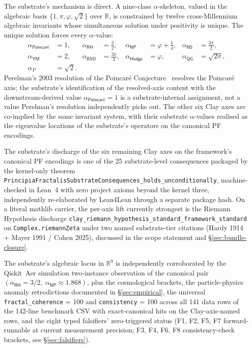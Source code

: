 \documentclass[11pt,a4paper]{amsart}
\theoremstyle{plain}
\theoremstyle{definition}
\begin{document}
The substrate's mechanism is direct. A nine-class $\alpha$-skeleton, valued in the algebraic basis $\{1,\pi,\varphi,\sqrt{2}\}$ over $\mathbb{R}$, is constrained by twelve cross-Millennium algebraic invariants whose simultaneous solution under positivity is unique. The unique solution forces every $\alpha$-value:
\[
\begin{aligned}
\alpha_{\textsf{Poincar\'e}} &= 1, &
\alpha_{\textsf{RH}} &= \tfrac{3}{2}, &
\alpha_{\textsf{NP}} &= \varphi + \tfrac{1}{4}, &
\alpha_{\textsf{NS}} &= \tfrac{3\pi}{2},\\
\alpha_{\textsf{YM}} &= 2, &
\alpha_{\textsf{BSD}} &= \tfrac{3\pi}{4}, &
\alpha_{\textsf{Hodge}} &= \varphi, &
\alpha_{\textsf{QG}} &= \sqrt{2\pi},\\
\alpha_{P} &= \sqrt{2}. & & & & & &
\end{aligned}
\]
Perelman's 2003 resolution of the Poincar\'e Conjecture~\cite{perelman2003} resolves the Poincar\'e axis; the substrate's identification of the resolved-axis content with the downstream-derived value $\alpha_{\textsf{Poincar\'e}}=1$ is a substrate-internal assignment, not a value Perelman's resolution independently picks out. The other six Clay axes are co-implied by the same invariant system, with their substrate $\alpha$-values realised as the eigenvalue locations of the substrate's operators on the canonical PF encodings.

The substrate's discharge of the six remaining Clay axes on the framework's canonical PF encodings is one of the 25 substrate-level consequences packaged by the kernel-only theorem \texttt{PrincipiaFractalisSubstrateConsequences\_holds\_unconditionally}, machine-checked in Lean~4 with zero project axioms beyond the kernel three, independently re-elaborated by Lean4Lean through a separate package hash. On a literal mathlib carrier, the per-axis lift currently strongest is the Riemann Hypothesis discharge \texttt{clay\_riemann\_hypothesis\_standard\_framework\_standard} on \texttt{Complex.riemannZeta} under two named substrate-tier citations (Hardy 1914 + Mayer 1991 / Cohen 2025), discussed in the scope statement and \S\ref{sec:bundle-closure}.

The substrate's algebraic locus in $\mathbb{R}^9$ is independently corroborated by the Qiskit~Aer simulation two-instance observation of the canonical pair $(\alpha_{\textsf{RH}}=3/2,\;\alpha_{\textsf{NP}}\approx 1.868)$, plus the cosmological brackets, the particle-physics anomaly retrodictions documented in \S\ref{sec:empirical}, the universal \texttt{fractal\_coherence} = 100 and \texttt{consistency} = 100 across all 141 data rows of the 142-line benchmark CSV with exact-canonical hits on the Clay-axis-named rows, and the eight typed falsifiers' zero-triggered status (F1, F2, F5, F7 forward-runnable at current measurement precision; F3, F4, F6, F8 consistency-check brackets, see \S\ref{sec:falsifiers}).
\end{document}
